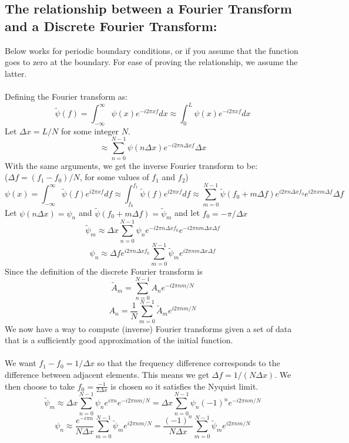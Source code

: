 \documentclass[a4paper,12pt]{report}
\begin{document}
\subsection{The relationship between a Fourier Transform and a Discrete Fourier Transform:}
Below works for periodic boundary conditions, or if you assume that the function goes to zero at the boundary. For ease of proving the relationship, we assume the latter. 
\\\\
Defining the Fourier transform as:
$$\tilde \psi(f) = \int_{-\infty}^\infty \psi(x) e^{-i2\pi xf} dx \approx \int_0^L\psi(x)e^{-i2\pi x f}dx$$
Let $\Delta x=L/N$ for some integer $N$.
$$\approx \sum\limits_{n=0}^{N-1}\psi(n \Delta x) e^{-i 2\pi n \Delta x f}\Delta x$$
With the same arguments, we get the inverse Fourier transform to be:\\ 
($\Delta f = (f_1-f_0)/N$, for some values of $f_1$ and $f_2$)
$$\psi(x) = \int_{-\infty}^\infty \tilde\psi(f)e^{i 2\pi x f} df \approx \int_{f_0}^{f_1}\tilde\psi(f)e^{i 2\pi x f}df \approx \sum\limits_{m=0}^{N-1}\tilde\psi(f_0+m\Delta f)e^{i 2\pi n\Delta x f_0} e^{i 2\pi x m\Delta f}\Delta f$$
Let $\psi(n\Delta x) = \psi_n$ and $\tilde\psi(f_0+m\Delta f) = \tilde \psi_m$ and let $f_0=-\pi/\Delta x$ 
$$\tilde \psi_m\approx \Delta x \sum\limits_{n=0}^{N-1}\psi_n e^{-i 2\pi n \Delta x f_0}e^{-i 2\pi n m \Delta x \Delta f}$$
$$\psi_n  \approx \Delta f e^{i 2\pi n\Delta x f_0}\sum\limits_{m=0}^{N-1}\tilde\psi_m e^{i 2\pi n m \Delta x \Delta f}$$
Since the definition of the discrete Fourier transform is
$$\tilde A_m =  \sum\limits_{n=0}^{N-1} A_n e^{-i 2\pi n m/N}$$
$$A_n  = \frac{1}{N}\sum\limits_{m=0}^{N-1}\tilde A_m e^{i 2\pi n m/N}$$
We now have a way to compute (inverse) Fourier transforms given a set of data that is a sufficiently good approximation of the initial function.
\\\\
We want $f_1-f_0=1/\Delta x$ so that the frequency difference corresponds to the difference between adjacent elements. This means we get $\Delta f = 1/(N\Delta x)$. We then choose to take $f_0=\frac{-1}{2\Delta x}$ is chosen so it satisfies the Nyquist limit.
$$\tilde \psi_m\approx \Delta x \sum\limits_{n=0}^{N-1}\psi_n e^{i \pi n }e^{-i 2\pi n m/N}=\Delta x \sum\limits_{n=0}^{N-1}\psi_n (-1)^n e^{-i 2\pi n m/N}$$
$$\psi_n  \approx \frac{e^{-i \pi n}}{N\Delta x}\sum\limits_{m=0}^{N-1}\tilde\psi_m e^{i 2\pi n m/N}=\frac{(-1)^n }{N\Delta x}\sum\limits_{m=0}^{N-1}\tilde\psi_m e^{i 2\pi n m/N}$$
\end{document}
